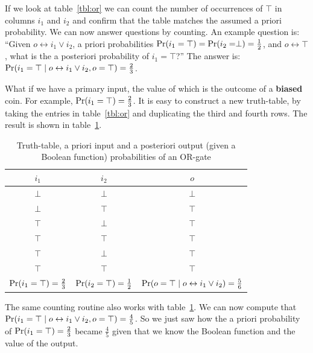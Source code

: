 \documentclass{article}
\begin{document}
%
If we look at table~\ref{tbl:or} we can count the number of
occurrences of $\top$ in columns $i_1$ and $i_2$ and confirm that the
table matches the assumed a priori probability. We can now answer
questions by counting. An example question is: ``Given $o
\leftrightarrow i_1 \vee i_2$, a priori probabilities $\mbox{Pr}(i_1 =
  \top) = \mbox{Pr}(i_2 = \perp) = \frac{1}{2}$, and $o \leftrightarrow
\top$, what is the a posteriori probability of $i_1 = \top$?'' The
answer is: $\mbox{Pr}(i_1 = \top \;|\; o \leftrightarrow i_1 \vee i_2, o
  = \top) = \frac{2}{3}$.
\par
What if we have a primary input, the value of which is the outcome of
a \textbf{biased} coin. For example, $\mbox{Pr}(i_1 = \top) =
\frac{2}{3}$. It is easy to construct a new truth-table, by taking the
entries in table~\ref{tbl:or} and duplicating the third and fourth
rows. The result is shown in table~\ref{tbl:or_biased}.
\par
\begin{table}[hbt]
\begin{center}
\begin{tabular}{ccc}
  \toprule
  $i_1$   & $i_2$    & $o$     \\
  \midrule
  $\perp$ & $\perp$  & $\perp$ \\
  $\perp$ & $\top$   & $\top$  \\
  $\top$  & $\perp$  & $\top$  \\
  $\top$  & $\top$   & $\top$  \\
  $\top$  & $\perp$  & $\top$  \\
  $\top$  & $\top$   & $\top$  \\
  \midrule
  $\mbox{Pr}(i_1 = \top) = \frac{2}{3}$ & $\mbox{Pr}(i_2 = \top) = \frac{1}{2}$ & $\mbox{Pr}(o = \top \;|\; o \leftrightarrow i_1 \vee i_2) = \frac{5}{6}$ \\
  \bottomrule
\end{tabular}
\end{center}
\caption{Truth-table, a priori input and a posteriori output (given a Boolean function) probabilities of an OR-gate\label{tbl:or_biased}}
\end{table}
\par
The same counting routine also works with
table~\ref{tbl:or_biased}. We can now compute that $\mbox{Pr}(i_1 = \top
  \;|\; o \leftrightarrow i_1 \vee i_2, o = \top) =
\frac{4}{5}$. So we just saw how the a priori probability of $\mbox{Pr}(i_1
  = \top) = \frac{2}{3}$ became $\frac{4}{5}$ given that we know the
Boolean function and the value of the output.
\par
\end{document}
